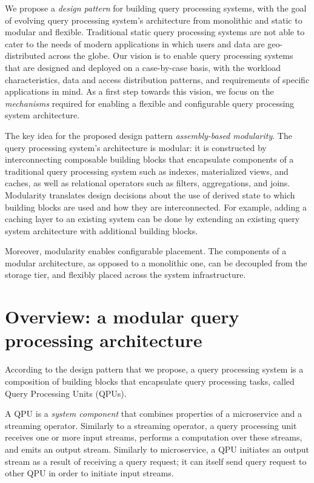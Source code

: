 
We propose a \textit{design pattern} for building query processing systems,
with the goal of evolving query processing system's architecture from monolithic and static to modular and flexible.
Traditional static query processing systems are not able to cater to the needs of modern applications in which users and
data are geo-distributed across the globe.
Our vision is to enable query processing systems that are designed and deployed on a case-by-case basis,
with the workload characteristics, data and access distribution patterns, and requirements of specific applications in
mind.
As a first step towards this vision, we focus on the \textit{mechanisms} required for enabling a flexible and configurable
query processing system architecture.

\medskip

The key idea for the proposed design pattern \textit{assembly-based modularity}.
The query processing system's architecture is modular:
it is constructed by interconnecting composable building blocks
that encapsulate components of a traditional query processing system such as indexes, materialized views,
and caches, as well as relational operators such as filters, aggregations, and joins.
Modularity translates design decisions about the use of derived state to which building blocks are used and how they are
interconnected.
For example, adding a caching layer to an existing system can be done by extending an existing query system architecture
with additional building blocks.

Moreover, modularity enables configurable placement.
The components of a modular architecture, as opposed to a monolithic one,
can be decoupled from the storage tier, and flexibly placed across the system infrastructure.


\section{Overview: a modular query processing architecture}

According to the design pattern that we propose,
a query processing system is a composition of building blocks that encapsulate query processing tasks, called
Query Processing Units (QPUs).

A QPU is a \textit{system component} that combines properties of a microservice and a streaming operator.
Similarly to a streaming operator, a query processing unit receives one or more input streams,
performs a computation over these streams, and emits an output stream.
Similarly to microservice, a QPU initiates an output stream as a result of receiving a query request;
it can itself send query request to other QPU in order to initiate input streams.


